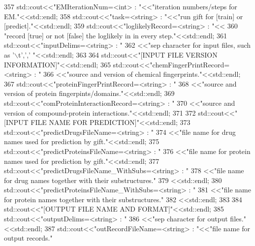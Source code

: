 \begin{DoxyCode}
357     std::cout<<\textcolor{stringliteral}{"EMIterationNum=<int> : "}<<\textcolor{stringliteral}{"iteration numbers/steps for EM."}<<std::endl;
358     std::cout<<\textcolor{stringliteral}{"task=<string> : "}<<\textcolor{stringliteral}{"run gift for [train] or [predict]."}<<std::endl;
359     std::cout<<\textcolor{stringliteral}{"loglikelyRecord=<string> : "}<<
360       \textcolor{stringliteral}{"record [true] or not [false] the loglikely in in every step."}<<std::endl;
361     std::cout<<\textcolor{stringliteral}{"inputDelims=<string> : "}
362              <<\textcolor{stringliteral}{"sep character for input files, such as  '\(\backslash\)t',',' "}<<std::endl;
363 
364     std::cout<<\textcolor{stringliteral}{"[INPUT FILE VERSION INFORMATION]"}<<std::endl;
365     std::cout<<\textcolor{stringliteral}{"chemFingerPrintRecord=<string> : "}
366              <<\textcolor{stringliteral}{"source and version of chemical fingerprints."}<<std::endl;
367     std::cout<<\textcolor{stringliteral}{"proteinFingerPrintRecord=<string> : "}
368              <<\textcolor{stringliteral}{"source and version of protein fingerpints/domains."}<<std::endl;
369     std::cout<<\textcolor{stringliteral}{"comProteinInteractionRecord=<string> : "}
370              <<\textcolor{stringliteral}{"source and version of compound-protein interactions."}<<std::endl;
371 
372     std::cout<<\textcolor{stringliteral}{"[INPUT FILE NAME FOR PREDICTION]"}<<std::endl;
373     std::cout<<\textcolor{stringliteral}{"predictDrugsFileName=<string> : "}
374              <<\textcolor{stringliteral}{"file name for drug names used for prediction by gift."}<<std::endl;
375     std::cout<<\textcolor{stringliteral}{"predictProteinsFileName=<string> : "}
376              <<\textcolor{stringliteral}{"file name for protein names used for prediction by gift."}<<std::endl;
377     std::cout<<\textcolor{stringliteral}{"predictDrugsFileName\_WithSubs=<string> : "}
378              <<\textcolor{stringliteral}{"file name for drug names together with their substructures."}
379              <<std::endl;
380     std::cout<<\textcolor{stringliteral}{"predictProteinsFileName\_WithSubs=<string> : "}
381              <<\textcolor{stringliteral}{"file name for protein names together with their substructures."}
382              <<std::endl;
383 
384     std::cout<<\textcolor{stringliteral}{"[OUTPUT FILE NAME AND FORMAT]"}<<std::endl;
385     std::cout<<\textcolor{stringliteral}{"outputDelims=<string> : "}
386              <<\textcolor{stringliteral}{"sep character for output files."} <<std::endl;
387     std::cout<<\textcolor{stringliteral}{"outRecordFileName=<string> : "}<<\textcolor{stringliteral}{"file name for output records."}

\end{DoxyCode}
